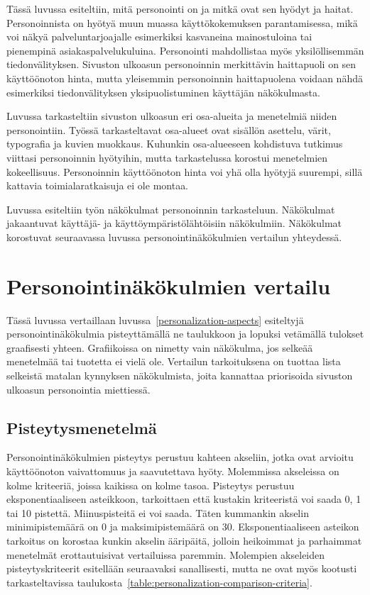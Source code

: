 \documentclass[finnish, 12pt, a4paper, elec, utf8, a-1b]{aaltothesis}
\begin{document}
Tässä luvussa esiteltiin, mitä personointi on ja mitkä ovat sen hyödyt ja
haitat. Personoinnista on hyötyä muun muassa käyttökokemuksen parantamisessa,
mikä voi näkyä palveluntarjoajalle esimerkiksi kasvaneina mainostuloina tai
pienempinä asiakaspalvelukuluina. Personointi mahdollistaa myös yksilöllisemmän
tiedonvälityksen. Sivuston ulkoasun personoinnin merkittävin haittapuoli on sen
käyttöönoton hinta, mutta yleisemmin personoinnin haittapuolena voidaan nähdä
esimerkiksi tiedonvälityksen yksipuolistuminen käyttäjän näkökulmasta.

Luvussa tarkasteltiin sivuston ulkoasun eri osa-alueita ja menetelmiä niiden
personointiin. Työssä tarkasteltavat osa-alueet ovat sisällön asettelu, värit,
typografia ja kuvien muokkaus. Kuhunkin osa-alueeseen kohdistuva tutkimus
viittasi personoinnin hyötyihin, mutta tarkastelussa korostui menetelmien
kokeellisuus. Personoinnin käyttöönoton hinta voi yhä olla hyötyjä suurempi,
sillä kattavia toimialaratkaisuja ei ole montaa.

Luvussa esiteltiin työn näkökulmat personoinnin tarkasteluun. Näkökulmat
jakaantuvat käyttäjä- ja käyttöympäristölähtöisiin näkökulmiin. Näkökulmat
korostuvat seuraavassa luvussa personointinäkökulmien vertailun yhteydessä.

\clearpage
\section{Personointinäkökulmien vertailu}\label{personalization-comparison}

Tässä luvussa vertaillaan luvussa~\ref{personalization-aspects} esiteltyjä
personointinäkökulmia pisteyttämällä ne taulukkoon ja lopuksi vetämällä tulokset
graafisesti yhteen. Grafiikoissa on nimetty vain näkökulma, jos selkeää
menetelmää tai tuotetta ei vielä ole. Vertailun tarkoituksena on tuottaa lista
selkeistä matalan kynnyksen näkökulmista, joita kannattaa priorisoida sivuston
ulkoasun personointia miettiessä.

\subsection{Pisteytysmenetelmä}

Personointinäkökulmien pisteytys perustuu kahteen akseliin, jotka ovat arvioitu
käyttöönoton vaivattomuus ja saavutettava hyöty. Molemmissa akseleissa on kolme
kriteeriä, joissa kaikissa on kolme tasoa. Pisteytys perustuu eksponentiaaliseen
asteikkoon, tarkoittaen että kustakin kriteeristä voi saada 0, 1 tai 10
pistettä. Miinuspisteitä ei voi saada. Täten kummankin akselin minimipistemäärä
on 0 ja maksimipistemäärä on 30. Eksponentiaaliseen asteikon tarkoitus on
korostaa kunkin akselin ääripäitä, jolloin heikoimmat ja parhaimmat menetelmät
erottautuisivat vertailuissa paremmin. Molempien akseleiden pisteytyskriteerit
esitellään seuraavaksi sanallisesti, mutta ne ovat myös kootusti
tarkasteltavissa taulukosta~\ref{table:personalization-comparison-criteria}.
\end{document}
